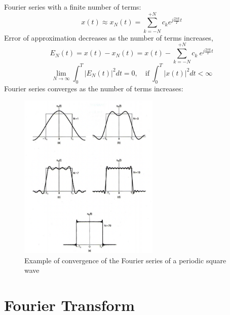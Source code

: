 \documentclass[12pt,a4paper]{article}
\begin{document}
\begin{tcolorbox}[breakable]
Fourier series with a finite number of terms:
\[ x(t) \approx x_{N}(t) = \sum_{k=-N}^{+N} c_{k} e^{j\frac{2\pi k}{T}t} \]
Error of approximation decreases as the number of terms increases,
\[ E_{N}(t) = x(t)-x_{N}(t) = x(t)- \sum_{k=-N}^{+N} c_{k} \ e^{j\frac{2\pi k}{T}t} \]
\[ \lim_{N \to \infty} \int_{0}^{T} \lvert E_{N}(t) \rvert^{2} dt = 0, \quad \text{if} \ \int_{0}^{T} \lvert x(t) \rvert^{2} dt < \infty \] 
Fourier series converges as the number of terms increases:
\begin{figure}[H]\centering
\includegraphics[width = 0.6\textwidth]{images/convergence}
\caption{Example of convergence of the Fourier series of a periodic square wave} \end{figure}
\end{tcolorbox}

\newpage
\section{Fourier Transform}
\end{document}
